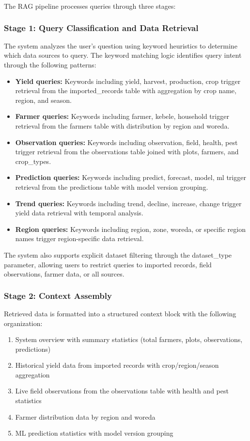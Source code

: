 The RAG pipeline processes queries through three stages:

\subsubsection{Stage 1: Query Classification and Data Retrieval}

The system analyzes the user's question using keyword heuristics to determine which data sources to query. The keyword matching logic identifies query intent through the following patterns:

\begin{itemize}
  \item \textbf{Yield queries:} Keywords including yield, harvest, production, crop trigger retrieval from the imported\_records table with aggregation by crop name, region, and season.
  \item \textbf{Farmer queries:} Keywords including farmer, kebele, household trigger retrieval from the farmers table with distribution by region and woreda.
  \item \textbf{Observation queries:} Keywords including observation, field, health, pest trigger retrieval from the observations table joined with plots, farmers, and crop\_types.
  \item \textbf{Prediction queries:} Keywords including predict, forecast, model, ml trigger retrieval from the predictions table with model version grouping.
  \item \textbf{Trend queries:} Keywords including trend, decline, increase, change trigger yield data retrieval with temporal analysis.
  \item \textbf{Region queries:} Keywords including region, zone, woreda, or specific region names trigger region-specific data retrieval.
\end{itemize}

The system also supports explicit dataset filtering through the dataset\_type parameter, allowing users to restrict queries to imported records, field observations, farmer data, or all sources.

\subsubsection{Stage 2: Context Assembly}

Retrieved data is formatted into a structured context block with the following organization:
\begin{enumerate}
  \item System overview with summary statistics (total farmers, plots, observations, predictions)
  \item Historical yield data from imported records with crop/region/season aggregation
  \item Live field observations from the observations table with health and pest statistics
  \item Farmer distribution data by region and woreda
  \item ML prediction statistics with model version grouping
\end{enumerate}

